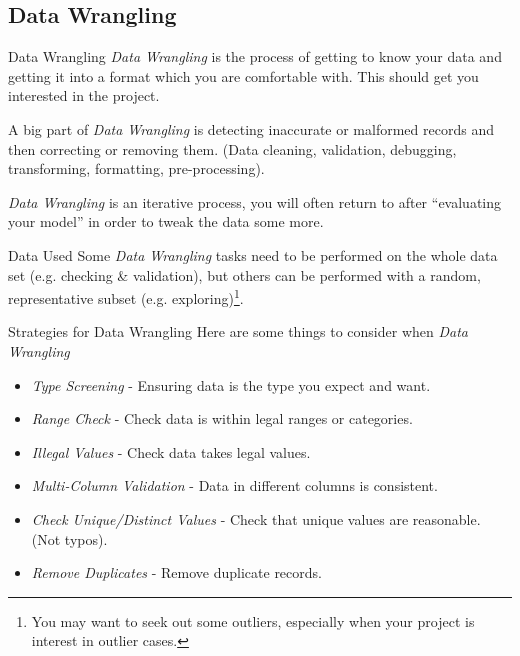 \documentclass[11pt,a4paper]{article}
\begin{document}
\subsection{Data Wrangling}

  \begin{definition}{Data Wrangling}
    \textit{Data Wrangling} is the process of getting to know your data and getting it into a format which you are comfortable with. This should get you interested in the project.
    \par A big part of \textit{Data Wrangling} is detecting inaccurate or malformed records and then correcting or removing them. (Data cleaning, validation, debugging, transforming, formatting, pre-processing).
    \par \textit{Data Wrangling} is an iterative process, you will often return to after ``evaluating your model'' in order to tweak the data some more.
  \end{definition}

  \begin{remark}{Data Used}
    Some \textit{Data Wrangling} tasks need to be performed on the whole data set (e.g. checking \& validation), but others can be performed with a random, representative subset (e.g. exploring)\footnote{You may want to seek out some outliers, especially when your project is interest in outlier cases.}.
  \end{remark}

  \begin{remark}{Strategies for Data Wrangling}
    Here are some things to consider when \textit{Data Wrangling}
    \begin{itemize}
      \item \textit{Type Screening} - Ensuring data is the type you expect and want.
      \item \textit{Range Check} - Check data is within legal ranges or categories.
      \item \textit{Illegal Values} - Check data takes legal values.
      \item \textit{Multi-Column Validation} - Data in different columns is consistent.
      \item \textit{Check Unique/Distinct Values} - Check that unique values are reasonable. (Not typos).
      \item \textit{Remove Duplicates} - Remove duplicate records.
    \end{itemize}
  \end{remark}
\end{document}
